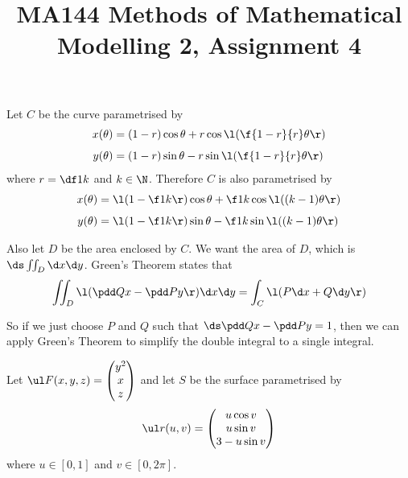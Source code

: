 \documentclass[a4paper]{article}
\title{MA144 Methods of Mathematical Modelling 2, Assignment 4}
\begin{document}
\maketitle

\setlength{\parindent}{0em}
\setlength{\parskip}{1em}


Let $C$ be the curve parametrised by \begin{align*}
x(\theta) &= (1-r) \cos \theta + r \cos \l( \f{1-r}{r} \theta \r) \\[1ex]
y(\theta) &= (1-r) \sin \theta - r \sin \l( \f{1-r}{r} \theta \r)
\end{align*}
where $r = \df1k$ and $k \in \N$. Therefore $C$ is also parametrised by \begin{align*}
x(\theta) &= \l( 1 - \f1k \r) \cos \theta + \f1k \cos \l( (k-1) \theta \r) \\[1ex]
y(\theta) &= \l( 1 - \f1k \r) \sin \theta - \f1k \sin \l( (k-1) \theta \r)
\end{align*}

Also let $D$ be the area enclosed by $C$. We want the area of $D$, which is $\ds \iint_D \d x \d y$. Green's Theorem states that $$\iint_D \l( \pdd Qx - \pdd Py \r) \d x \d y = \int_C \l( P \d x + Q \d y \r)$$

So if we just choose $P$ and $Q$ such that $\ds \pdd Qx - \pdd Py = 1$, then we can apply Green's Theorem to simplify the double integral to a single integral.




Let $\ul F(x, y, z) = \begin{pmatrix} y^2 \\ x \\ z \end{pmatrix}$ and let $S$ be the surface parametrised by $$\ul r(u,v) = \begin{pmatrix} u \cos v \\ u \sin v \\ 3 - u \sin v \end{pmatrix}$$
where $u \in [0,1]$ and $v \in [0, 2\pi]$.

\subsection{~}
\subsection{~}
\end{document}
